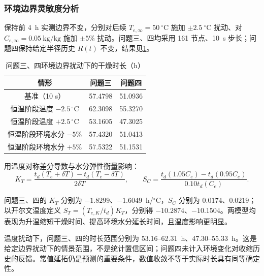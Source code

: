 \subsubsection{环境边界灵敏度分析}\label{sec:boundarysensitivity}

保持前 4~h 实测边界不变，分别对后续 $T_{e,\infty}=50~{}^\circ\mathrm C$ 施加 $\pm2.5~{}^\circ\mathrm C$ 扰动、对 $C_{e,\infty}=0.05~\mathrm{kg/kg}$ 施加 $\pm5\%$ 扰动。问题三、四均采用 161 节点、10~s 步长；问题四保持给定半径历史 $R(t)$ 不变，结果见\cref{tab:sens}。

\begin{table}[!htbp]
\centering
\caption{问题三、四环境边界扰动下的干燥时长（h）}\label{tab:sens}
\begin{tabular}{ccc}
\toprule
情形 & 问题三 & 问题四\\
\midrule
基准（10 s） & 57.4798 & 51.0936\\
恒温阶段温度 $-2.5\,{}^\circ$C & 62.3098 & 55.3270\\
恒温阶段温度 $+2.5\,{}^\circ$C & 53.1605 & 47.3025\\
恒温阶段环境水分 $-5\%$ & 57.4320 & 51.0413\\
恒温阶段环境水分 $+5\%$ & 57.5322 & 51.1531\\
\bottomrule
\end{tabular}
\end{table}

用温度对称差分导数与水分弹性衡量影响：
\begin{equation}
K_T=\frac{t_d(T_e+\delta T)-t_d(T_e-\delta T)}{2\delta T},\qquad
S_C=\frac{t_d(1.05C_e)-t_d(0.95C_e)}{0.10t_d(C_e)}.
\label{eq:sensitivity}
\end{equation}
\begin{samepage}
问题三、四的 $K_T$ 分别为 $-1.8299$、$-1.6049$~h/$^\circ$C，$S_C$ 分别为 $0.0174$、$0.0219$；以开尔文温度定义 $S_T=(T_{e,K}/t_d)K_T$，分别得 $-10.2874$、$-10.1504$。两模型均表现为升温缩短干燥时间、提高环境水分延长时间，且温度影响更明显。
\par\end{samepage}

温度扰动下，问题三、四的时长范围分别为 53.16--62.31~h、47.30--55.33~h。这是给定边界扰动下的情景范围，不是统计置信区间；问题四未计入环境变化对收缩历史的反馈。常值延拓仍是预测的重要条件，数值收敛不等于实际时长具有同等确定性。

